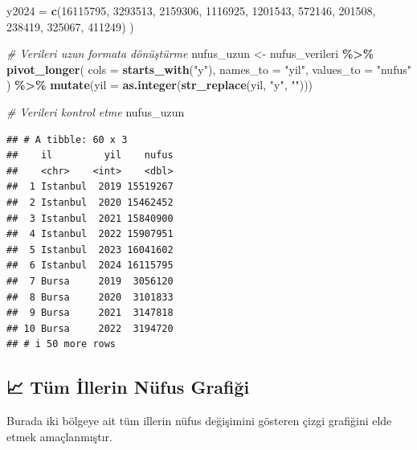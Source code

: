 \documentclass[
]{article}
\newenvironment{Shaded}{\begin{snugshade}}{\end{snugshade}}
\newcommand{\AttributeTok}[1]{\textcolor[rgb]{0.13,0.29,0.53}{#1}}
\newcommand{\CommentTok}[1]{\textcolor[rgb]{0.56,0.35,0.01}{\textit{#1}}}
\newcommand{\DecValTok}[1]{\textcolor[rgb]{0.00,0.00,0.81}{#1}}
\newcommand{\FunctionTok}[1]{\textcolor[rgb]{0.13,0.29,0.53}{\textbf{#1}}}
\newcommand{\NormalTok}[1]{#1}
\newcommand{\OtherTok}[1]{\textcolor[rgb]{0.56,0.35,0.01}{#1}}
\newcommand{\SpecialCharTok}[1]{\textcolor[rgb]{0.81,0.36,0.00}{\textbf{#1}}}
\newcommand{\StringTok}[1]{\textcolor[rgb]{0.31,0.60,0.02}{#1}}
\begin{document}
\begin{Shaded}
\begin{Highlighting}[]
  \AttributeTok{y2024 =} \FunctionTok{c}\NormalTok{(}\DecValTok{16115795}\NormalTok{, }\DecValTok{3293513}\NormalTok{, }\DecValTok{2159306}\NormalTok{, }\DecValTok{1116925}\NormalTok{, }\DecValTok{1201543}\NormalTok{,}
            \DecValTok{572146}\NormalTok{, }\DecValTok{201508}\NormalTok{, }\DecValTok{238419}\NormalTok{, }\DecValTok{325067}\NormalTok{, }\DecValTok{411249}\NormalTok{)}
\NormalTok{)}

\CommentTok{\# Verileri uzun formata dönüştürme}
\NormalTok{nufus\_uzun }\OtherTok{\textless{}{-}}\NormalTok{ nufus\_verileri }\SpecialCharTok{\%\textgreater{}\%}
  \FunctionTok{pivot\_longer}\NormalTok{(}
    \AttributeTok{cols =} \FunctionTok{starts\_with}\NormalTok{(}\StringTok{"y"}\NormalTok{),}
    \AttributeTok{names\_to =} \StringTok{"yil"}\NormalTok{,}
    \AttributeTok{values\_to =} \StringTok{"nufus"}
\NormalTok{  ) }\SpecialCharTok{\%\textgreater{}\%}
  \FunctionTok{mutate}\NormalTok{(}\AttributeTok{yil =} \FunctionTok{as.integer}\NormalTok{(}\FunctionTok{str\_replace}\NormalTok{(yil, }\StringTok{"y"}\NormalTok{, }\StringTok{""}\NormalTok{)))}

\CommentTok{\# Verileri kontrol etme}
\NormalTok{nufus\_uzun}
\end{Highlighting}
\end{Shaded}

\begin{verbatim}
## # A tibble: 60 x 3
##    il         yil    nufus
##    <chr>    <int>    <dbl>
##  1 Istanbul  2019 15519267
##  2 Istanbul  2020 15462452
##  3 Istanbul  2021 15840900
##  4 Istanbul  2022 15907951
##  5 Istanbul  2023 16041602
##  6 Istanbul  2024 16115795
##  7 Bursa     2019  3056120
##  8 Bursa     2020  3101833
##  9 Bursa     2021  3147818
## 10 Bursa     2022  3194720
## # i 50 more rows
\end{verbatim}

\subsection{📈 Tüm İllerin Nüfus
Grafiği}\label{tuxfcm-illerin-nuxfcfus-grafiux11fi}

Burada iki bölgeye ait tüm illerin nüfus değişimini gösteren çizgi
grafiğini elde etmek amaçlanmıştır.
\end{document}
